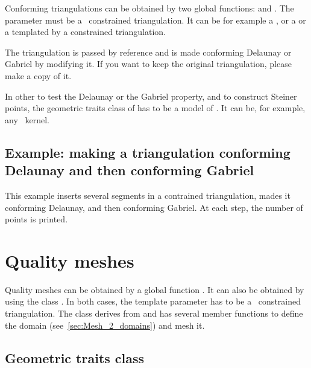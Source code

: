 Conforming triangulations can be obtained by two global functions:
 and
. The
parameter  must be a \cgal\ constrained triangulation. It
can be for example a , or a
 or a 
templated by a constrained triangulation.

The triangulation  is passed by reference and is made conforming
Delaunay or Gabriel by modifying it. If you want to keep the original
triangulation, please make a copy of it.

In other to test the Delaunay or the Gabriel property, and to construct
Steiner points, the geometric traits class of  has to be a model of
. It can be, for example, any
\cgal\ kernel.

\subsection{Example: making a triangulation conforming Delaunay and then
  conforming Gabriel}
\label{sec:Mesh_2_example_making_conforming}

This example inserts several segments in a contrained triangulation, mades
it conforming Delaunay, and then conforming Gabriel. At each step, the
number of points is printed.


\section{Quality meshes}
\label{sec:Mesh_2_quality_meshes}

Quality meshes can be obtained by a global function . It can
 also be obtained by using the class . In both
 cases, the template parameter  has to be a \cgal\ constrained
 triangulation. The class  derives from 
 and has several member functions to define the domain
 (see~\ref{sec:Mesh_2_domains}) and mesh it.

\subsection{Geometric traits class}
\label{sec:Mesh_2_geomtraits}

